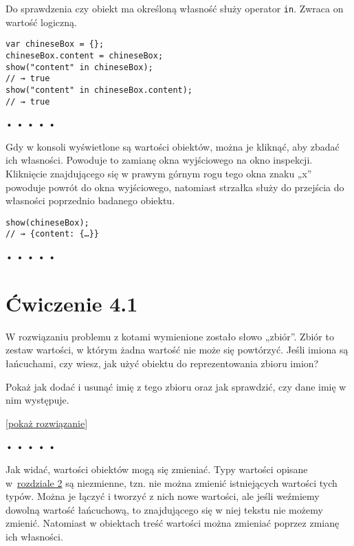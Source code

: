 Do sprawdzenia czy obiekt ma określoną własność służy operator \texttt{in}. Zwraca on wartość logiczną.

    
\begin{verbatim} 
var chineseBox = {};
chineseBox.content = chineseBox;
show("content" in chineseBox);
// → true
show("content" in chineseBox.content);
// → true
\end{verbatim}
  
  
\begin{center}
• • • • •
\end{center}
  
    
Gdy w konsoli wyświetlone są wartości obiektów, można je kliknąć, aby zbadać ich własności. Powoduje to zamianę okna wyjściowego na okno inspekcji. Kliknięcie znajdującego się w prawym górnym rogu tego okna znaku „x” powoduje powrót do okna wyjściowego, natomiast strzałka służy do przejścia do własności poprzednio badanego obiektu.

    
\begin{verbatim} 
show(chineseBox);
// → {content: {…}}
\end{verbatim}
  
  
\begin{center}
• • • • •
\end{center}
  
    
\section*{Ćwiczenie 4.1}
\label{sec:4.1}
    
      
W rozwiązaniu problemu z kotami wymienione zostało słowo „zbiór”. Zbiór to zestaw wartości, w którym żadna wartość nie może się powtórzyć. Jeśli imiona są łańcuchami, czy wiesz, jak użyć obiektu do reprezentowania zbioru imion?

      
Pokaż jak dodać i usunąć imię z tego zbioru oraz jak sprawdzić, czy dane imię w nim występuje.

    
[\hyperref[sol:4.1]{pokaż rozwiązanie}]
    
    
  
  
\begin{center}
• • • • •
\end{center}
  
    
Jak widać, wartości obiektów mogą się zmieniać. Typy wartości opisane w~\hyperref[chap:2]{rozdziale 2} są niezmienne, tzn. nie można zmienić istniejących wartości tych typów. Można je łączyć i tworzyć z nich nowe wartości, ale jeśli weźmiemy dowolną wartość łańcuchową, to znajdującego się w niej tekstu nie możemy zmienić. Natomiast w obiektach treść wartości można zmieniać poprzez zmianę ich własności.

